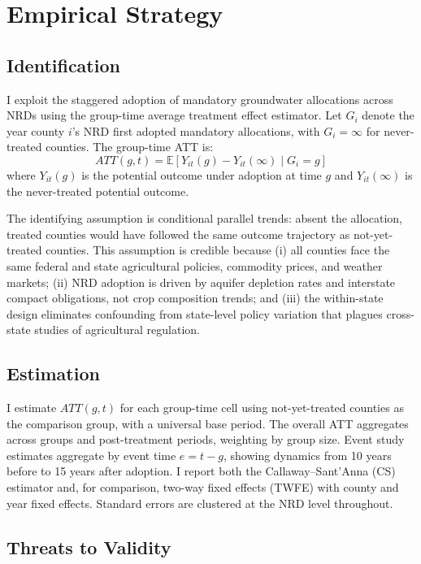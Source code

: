 \documentclass[12pt]{article}
\newcommand{\E}{\mathbb{E}}
\begin{document}
\section{Empirical Strategy}

\subsection{Identification}

I exploit the staggered adoption of mandatory groundwater allocations across NRDs using the \citet{callaway2021difference} group-time average treatment effect estimator. Let $G_i$ denote the year county $i$'s NRD first adopted mandatory allocations, with $G_i = \infty$ for never-treated counties. The group-time ATT is:
\begin{equation}
ATT(g,t) = \E\left[Y_{it}(g) - Y_{it}(\infty) \mid G_i = g\right]
\end{equation}
where $Y_{it}(g)$ is the potential outcome under adoption at time $g$ and $Y_{it}(\infty)$ is the never-treated potential outcome.

The identifying assumption is conditional parallel trends: absent the allocation, treated counties would have followed the same outcome trajectory as not-yet-treated counties. This assumption is credible because (i) all counties face the same federal and state agricultural policies, commodity prices, and weather markets; (ii) NRD adoption is driven by aquifer depletion rates and interstate compact obligations, not crop composition trends; and (iii) the within-state design eliminates confounding from state-level policy variation that plagues cross-state studies of agricultural regulation.

\subsection{Estimation}

I estimate $ATT(g,t)$ for each group-time cell using not-yet-treated counties as the comparison group, with a universal base period. The overall ATT aggregates across groups and post-treatment periods, weighting by group size. Event study estimates aggregate by event time $e = t - g$, showing dynamics from 10 years before to 15 years after adoption. I report both the Callaway--Sant'Anna (CS) estimator and, for comparison, two-way fixed effects (TWFE) with county and year fixed effects. Standard errors are clustered at the NRD level throughout.

\subsection{Threats to Validity}
\end{document}
